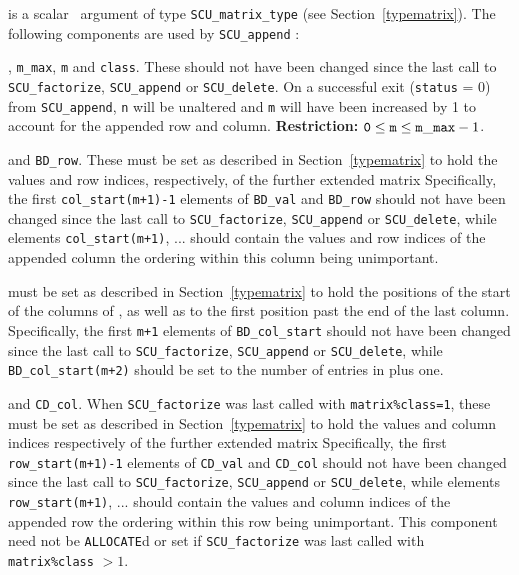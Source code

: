 \documentclass{galahad}
\newcommand{\packagename}{SCU}
\begin{document}
\vspace*{-2mm}
\begin{description}
 is a scalar \intentinout\ argument of type
{\tt \packagename\_matrix\_type}
(see Section~\ref{typematrix}). The following components are used by
{\tt \packagename\_append} :

\begin{description}
, {\tt m\_max}, {\tt m} and {\tt class}.
These should not have been changed since the last call to
{\tt \packagename\_factorize}, {\tt \packagename\_append} or
{\tt \packagename\_delete}.
On a successful exit ({\tt status} = 0) from {\tt \packagename\_append},
{\tt n} will be unaltered and {\tt m} will have
been increased by 1 to account for the appended row and column.
{\bf Restriction:} ${\tt 0} \leq {\tt m} \leq {\tt m\_max}-1$.

 and {\tt BD\_row}. These must be set as described
in Section~\ref{typematrix} to hold the values and row indices, respectively,
of the further extended matrix
Specifically, the first {\tt col\_start(m+1)-1} elements
of {\tt BD\_val} and {\tt BD\_row} should not have been changed since the
last call to
{\tt \packagename\_factorize}, {\tt \packagename\_append} or
{\tt \packagename\_delete}, while
elements {\tt col\_start(m+1)}, ... should contain
the values and row indices of the appended column
the ordering within this column being unimportant.

 must be set as described in
Section~\ref{typematrix} to hold the
positions of the start of the columns of , as well as to the first
position past the end of the last column.
Specifically, the first {\tt m+1} elements
of {\tt BD\_col\_start} should not have been changed since the last call to
{\tt \packagename\_factorize}, {\tt \packagename\_append} or
{\tt \packagename\_delete}, while
{\tt BD\_col\_start(m+2)} should be set to the number of entries in
 plus one.

 and {\tt CD\_col}.
When {\tt \packagename\_factorize} was last called with {\tt matrix\%class=1},
these must be set as described in Section~\ref{typematrix} to hold the
values and column indices respectively of the further extended matrix
Specifically, the first {\tt row\_start(m+1)-1} elements
of {\tt CD\_val} and {\tt CD\_col} should not have been changed since the
last call to
{\tt \packagename\_factorize}, {\tt \packagename\_append} or
{\tt \packagename\_delete}, while
elements {\tt row\_start(m+1)}, ... should contain
the values and column indices of the appended row
the ordering within this row being unimportant.
This component need not be {\tt ALLOCATE}d or set if
{\tt \packagename\_fac\-torize} was last called with {\tt matrix\%class} $> 1$.


\end{description}
\end{description}
\end{document}
